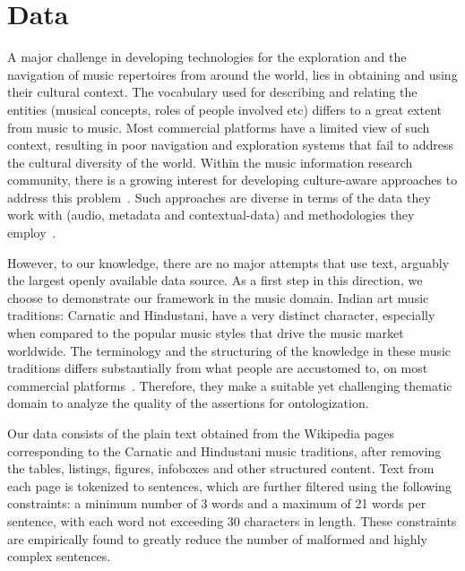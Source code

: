 \documentclass{llncs}
\begin{document}
\section{Data}
\label{sec:data}
A major challenge in developing technologies for the exploration and the navigation of music repertoires from around the world, lies in obtaining and using their cultural context. The vocabulary used for describing and relating the entities (musical concepts, roles of people involved etc) differs to a great extent from music to music. Most commercial platforms have a limited view of such context, resulting in poor navigation and exploration systems that fail to address the cultural diversity of the world.  Within the music information research community, there is a growing interest for developing culture-aware approaches to address this problem~\cite{Serra2011}. Such approaches are diverse in terms of the data they work with (audio, metadata and contextual-data) and methodologies they employ~\cite{Serra2013a}. 

However, to our knowledge, there are no major attempts that use text, arguably the largest openly available data source. As a first step in this direction, we choose to demonstrate our framework in the music domain. Indian art music traditions: Carnatic and Hindustani, have a very distinct character, especially when compared to the popular music styles that drive the music market worldwide. The terminology and the structuring of the knowledge in these music traditions differs substantially from what people are accustomed to, on most commercial platforms~\cite{Krishna2012}. Therefore, they make a suitable yet challenging thematic domain to analyze the quality of the assertions for ontologization. 

Our data consists of the plain text obtained from the Wikipedia pages corresponding to the Carnatic and Hindustani music traditions, after removing the tables, listings, figures, infoboxes and other structured content. Text from each page is tokenized to sentences, which are further filtered using the following constraints: a minimum number of 3 words and a maximum of 21 words per sentence, with each word not exceeding 30 characters in length. These constraints are empirically found to greatly reduce the number of malformed and highly complex sentences.
\end{document}
